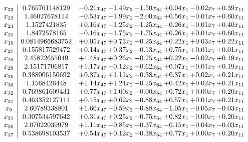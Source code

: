\documentclass[8pt]{article}
\begin{document}
\[\begin{array}{c| c c@{\hskip 2pt} c@{\hskip 2pt} c@{\hskip 2pt} c@{\hskip 2pt} c@{\hskip 2pt} c@{\hskip 2pt} }
 x_{22}   &  0.765761148129 & -0.21 x_{47} & -1.49 x_{2} & +  1.50 x_{64} & +  0.04 x_{1} & -0.02 x_{7} & +  0.39 x_{11}\\
 x_{23}   &  1.46027678114 & -0.53 x_{47} & -1.99 x_{2} & +  2.00 x_{64} & +  0.56 x_{1} & -0.01 x_{7} & +  0.60 x_{11}\\
 x_{24}   &  1.1527421835 & +  0.16 x_{47} & -1.25 x_{2} & +  1.25 x_{64} & -0.26 x_{1} & -0.01 x_{7} & +  0.40 x_{11}\\
 x_{25}   &  1.8472578165 & -0.16 x_{47} & -1.75 x_{2} & +  1.75 x_{64} & +  0.26 x_{1} & +  0.01 x_{7} & +  0.60 x_{11}\\
 x_{18}   &  0.0814966683752 & +  0.05 x_{47} & +  0.73 x_{2} & +  0.25 x_{64} & +  0.22 x_{1} & +  0.03 x_{7} & +  0.22 x_{11}\\
 x_{27}   &  0.155817529472 & +  0.14 x_{47} & +  0.37 x_{2} & +  0.13 x_{64} & +  0.75 x_{1} & +  0.01 x_{7} & +  0.01 x_{11}\\
 x_{28}   &  2.45822655049 & +  1.48 x_{47} & +  0.26 x_{2} & -0.25 x_{64} & +  0.22 x_{1} & -0.02 x_{7} & +  0.19 x_{11}\\
 x_{29}   &  2.15171706817 & +  1.17 x_{47} & -0.12 x_{2} & +  0.62 x_{64} & +  0.07 x_{1} & -0.01 x_{7} & +  0.19 x_{11}\\
 x_{26}   &  0.388006150692 & +  0.37 x_{47} & +  1.11 x_{2} & +  0.38 x_{64} & +  0.37 x_{1} & +  0.02 x_{7} & +  0.21 x_{11}\\
 x_{30}   &  1.1568426448 & +  1.14 x_{47} & +  1.24 x_{2} & -0.25 x_{64} & +  0.42 x_{1} & +  0.02 x_{7} & +  0.21 x_{11}\\
 x_{32}   &  0.769861609431 & +  0.77 x_{47} & +  1.00 x_{2} & +  0.00 x_{64} & +  0.72 x_{1} & +  0.00 x_{7} & +  0.20 x_{11}\\
 x_{31}   &  0.463352127114 & +  0.45 x_{47} & +  0.62 x_{2} & +  0.88 x_{64} & +  0.57 x_{1} & +  0.01 x_{7} & +  0.21 x_{11}\\
 x_{9}   &  2.60789338801 & +  1.66 x_{47} & -0.59 x_{2} & -0.88 x_{64} & -1.05 x_{1} & -0.05 x_{7} & -0.03 x_{11}\\
 x_{35}   &  0.307534597642 & +  0.31 x_{47} & +  0.25 x_{2} & +  0.75 x_{64} & +  0.82 x_{1} & -0.00 x_{7} & +  0.20 x_{11}\\
 x_{36}   &  2.07022039979 & +  1.11 x_{47} & -0.85 x_{2} & +  0.37 x_{64} & -0.15 x_{1} & -0.04 x_{7} & -0.03 x_{11}\\
 x_{37}   &  0.538698103537 & +  0.54 x_{47} & +  0.12 x_{2} & +  0.38 x_{64} & +  0.77 x_{1} & +  0.00 x_{7} & +  0.20 x_{11}\\

\end{array}\]
\end{document}
